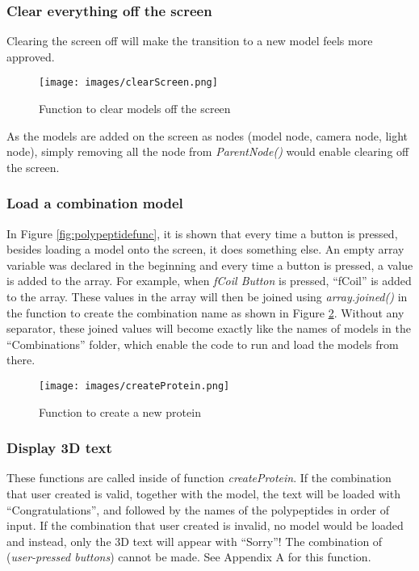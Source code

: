 \subsubsection{Clear everything off the screen}
Clearing the screen off will make the transition to a new model feels more approved. 
\begin{figure}[!htp]
	\centering
	\texttt{[image: images/clearScreen.png]}
	\caption{Function to clear models off the screen}
	\label{fig:clearScreen}
\end{figure}

As the models are added on the screen as nodes (model node, camera node, light node), simply removing all the node from \emph{ParentNode()} would enable clearing off the screen.

\subsubsection{Load a combination model}
In Figure \ref{fig:polypeptidefunc}, it is shown that every time a button is pressed, besides loading a model onto the screen, it does something else. An empty array variable was declared in the beginning and every time a button is pressed, a value is added to the array. For example, when \emph{fCoil Button} is pressed, “fCoil” is added to the array. These values in the array will then be joined using \emph{array.joined()} in the function to create the combination name as shown in Figure \ref{fig:createProtein}. Without any separator, these joined values will become exactly like the names of models in the “Combinations” folder, which enable the code to run and load the models from there. 
\begin{figure}[!htp]
	\centering
	\texttt{[image: images/createProtein.png]}
	\caption{Function to create a new protein}
	\label{fig:createProtein}
\end{figure}

\subsubsection{Display 3D text}
These functions are called inside of function \emph{createProtein}. If the combination that user created is valid, together with the model, the text will be loaded with “Congratulations”, and followed by the names of the polypeptides in order of input. If the combination that user created is invalid, no model would be loaded and instead, only the 3D text will appear with “Sorry”! The combination of (\emph{user-pressed buttons}) cannot be made. See Appendix A for this function. 

